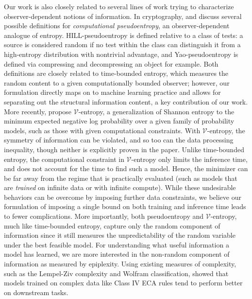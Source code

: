 \documentclass[twoside]{article}
\begin{document}
Our work is also closely related to several lines of work trying to characterize observer-dependent notions of information. In cryptography, \citet{barak2003computational} and \citet{hsiao2007conditional} discuss several possible definitions for \emph{computational pseudoentropy}, an observer-dependent analogue of entropy.
HILL-pseudoentropy \citep{haastad1999pseudorandom} is defined relative to a class of tests: a source is considered random if no test within the class can distinguish it from a high-entropy distribution with nontrivial advantage, and Yao-pseudoentropy is defined via compressing and decompressing an object for example.
Both definitions are closely related to time-bounded entropy, which measures the random content to a given computationally bounded observer; however, our formulation directly maps on to machine learning practice and allows for separating out the structural information content, a key contribution of our work. %
%
More recently, \citet{xu2020theory} propose $\mathcal{V}$-entropy, a generalization of Shannon entropy to the minimum expected negative log probability over a given family of probability models, such as those with given computational constraints. With $\mathcal{V}$-entropy, the symmetry of information can be violated, and so too can the data processing inequality, though neither is explicitly proven in the paper. Unlike time-bounded entropy, the computational constraint in $\mathcal{V}$-entropy only limits the inference time, and does not account for the time to find such a model. 
Hence, the minimizer can be far away from the regime that is practically evaluated (such as models that are \emph{trained} on infinite data or with infinite compute). 
While these undesirable behaviors can be overcome by imposing further data constraints, we believe our formulation of imposing a single bound on both training and inference time leads to fewer complications. 
More importantly, both pseudoentropy and $\mathcal{V}$-entropy, much like time-bounded entropy, capture only the random component of information since it still measures the unpredictability of the random variable under the best feasible model.
For understanding what useful information a model has learned, we are more interested in the non-random component of information as measured by epiplexity. Using existing measures of complexity, such as the Lempel-Ziv complexity and Wolfram classification, \citet{zhang2024intelligence} showed that models trained on complex data like Class IV ECA rules tend to perform better on downstream tasks.
\end{document}
